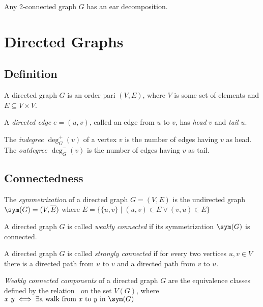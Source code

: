\documentclass{classnotes}
\begin{document}
\begin{theorem}
    Any 2-connected graph $G$ has an ear decomposition.
\end{theorem}

\section{Directed Graphs}
\subsection{Definition}
\begin{definition}
    A directed graph $G$ is an order pari $(V,E)$, where $V$ is some set of elements and $E \subseteq V \times V$.

    A \emph{directed edge} $e = (u,v)$, called an edge from $u$ to $v$, has \emph{head} $v$ and \emph{tail} $u$.

    The \emph{indegree $\deg_G^+(v)$} of a vertex $v$ is the number of edges having $v$ as head. The \emph{outdegree $\deg_G^-(v)$} is the number of
    edges having $v$ as tail.
\end{definition}

\subsection{Connectedness}
\begin{definition}[Symmetrization]
    The \emph{symmetrization} of a directed graph $G=(V,E)$ is the undirected graph $\sym(G) = (V,\overline{E})$ where $\overline{E} = \{ \{u,v\} \mid (u,v) \in E \lor (v,u) \in E \}$
\end{definition}

\begin{definition}
    A directed graph $G$ is called \emph{weakly connected} if its symmetrization $\sym(G)$ is connected.
\end{definition}

\begin{definition}
    A directed graph $G$ is called \emph{strongly connected} if for every two vertices $u,v \in V$ there is a directed path from $u$ to $v$ and a directed path from $v$ to $u$.
\end{definition}

\begin{definition}
    \emph{Weakly connected components} of a directed graph $G$ are the equivalence classes defined by the relation $~$ on the set $V(G)$, where $x~y \iff \exists \text{a walk from $x$ to $y$ in $\sym(G)$} $
\end{definition}
\end{document}
